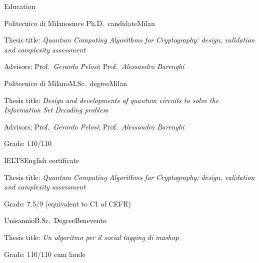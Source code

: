 \documentclass[
	a4paper, %
	10pt, %
]{tresume} %
\begin{document}
\begin{tSection}{Education}
  \begin{tSubsection}{Politecnico di Milano}{since }{Ph.D.\ candidate}{Milan}
  \item Thesis title: \emph{Quantum Computing Algorithms for Cryptography: design, validation and complexity assessment}
  \item Advisors: Prof.\ \emph{Gerardo Pelosi}; Prof.\ \emph{Alessandro Barenghi}
  \end{tSubsection}
  \begin{tSubsection}{Politecnico di Milano}{}{M.Sc.\ degree}{Milan}
  \item Thesis title: \emph{Design and developments of quantum circuits to solve the Information Set Decoding problem}
  \item Advisors: Prof.\ \emph{Gerardo Pelosi}; Prof.\ \emph{Alessandro
      Barenghi}
  \item Grade: 110/110
  \end{tSubsection}
  \begin{tSubsection}{IELTS}{}{English certificate}{}
  \item Thesis title: \textit{Quantum Computing Algorithms for Cryptography: design, validation and complexity assessment}
  \item Grade: 7.5/9 (equivalent to C1 of CEFR)
  \end{tSubsection}
  \begin{tSubsection}{Unisannio}{}{B.Sc.\ Degree}{Benevento}
  \item Thesis title: \textit{Un algoritmo per il social tagging di mashup}
  \item Grade: 110/110 cum laude
  \end{tSubsection}
\end{tSection}
\end{document}
